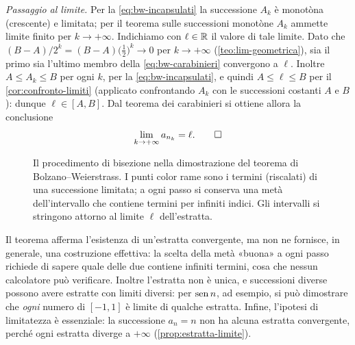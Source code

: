 \begin{dimostrazione}
\emph{Passaggio al limite.} Per la \eqref{eq:bw-incapsulati} la successione $A_{k}$ è
monotòna (crescente) e limitata; per il teorema sulle successioni monotòne $A_{k}$ ammette
limite finito per $k\to+\infty$. Indichiamo con $\ell\in\mathbb{R}$ il valore di tale limite. Dato
che $(B-A)/2^{k}=(B-A)\bigl(\frac12\bigr)^{k}\to0$ per $k\to+\infty$
(\cref{teo:lim-geometrica}), sia il primo sia l'ultimo membro della
\eqref{eq:bw-carabinieri} convergono a $\ell$. Inoltre $A\le A_{k}\le B$ per ogni $k$, per
la \eqref{eq:bw-incapsulati}, e quindi $A\le\ell\le B$ per il \cref{cor:confronto-limiti}
(applicato confrontando $A_{k}$ con le successioni costanti $A$ e $B$): dunque
$\ell\in[A,B]$. Dal teorema dei carabinieri si ottiene allora la conclusione
\begin{equation}\label{eq:bw-tesi}
  \lim_{k\to+\infty}a_{n_{k}}=\ell. \qedhere
\end{equation}
\end{dimostrazione}

\begin{figure}[htb]
\centering
{}
\caption{Il procedimento di bisezione nella dimostrazione del teorema di
Bolzano--Weierstrass. I punti color rame sono i termini (riscalati) di una successione
limitata; a ogni passo si conserva una metà dell'intervallo che contiene termini per
infiniti indici. Gli intervalli si stringono attorno al limite $\ell$ dell'estratta.}
\label{fig:bolzano-weierstrass}
\end{figure}

\begin{osservazione}
Il teorema afferma l'esistenza di un'estratta convergente, ma non ne fornisce, in
generale, una costruzione effettiva: la scelta della metà «buona» a ogni passo richiede
di sapere quale delle due contiene infiniti termini, cosa che nessun calcolatore può
verificare. Inoltre l'estratta non è unica, e successioni diverse possono avere estratte
con limiti diversi: per $\operatorname{sen} n$, ad esempio, si può dimostrare che \emph{ogni} numero di
$[-1,1]$ è limite di qualche estratta. Infine, l'ipotesi di limitatezza è essenziale: la
successione $a_{n}=n$ non ha alcuna estratta convergente, perché ogni estratta diverge a
$+\infty$ (\cref{prop:estratta-limite}).
\end{osservazione}

